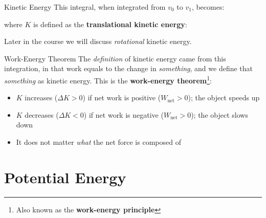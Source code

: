 \documentclass[12pt,compress,aspectratio=169]{beamer}
\begin{document}
\begin{frame}{Kinetic Energy}
  This integral, when integrated from $v_0$ to $v_1$, becomes:

  
  where $K$ is defined as the \textbf{translational kinetic energy}:


  Later in the course we will discuss \emph{rotational} kinetic energy.
\end{frame}



\begin{frame}{Work-Energy Theorem}
  The \emph{definition} of kinetic energy came from this integration, in that
  work equals to the change in \emph{something}, and we define that
  \emph{something} as kinetic energy. This is the
  \textbf{work-energy theorem}\footnote{Also known as the
  \textbf{work-energy principle}}:

  \begin{itemize}
  \item $K$ increases ($\Delta K>0$) if net work is positive ($W_\text{net}>0$);
    the object speeds up
  \item $K$ decreases ($\Delta K<0$) if net work is negative ($W_\text{net}>0$);
    the object slows down
  \item It does not matter \emph{what} the net force is composed of
  \end{itemize}
\end{frame}






\section{Potential Energy}
\end{document}

